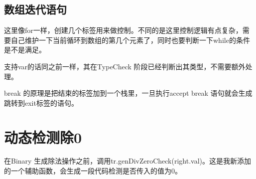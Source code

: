 \documentclass{article}
\theoremstyle{plain}
\theoremstyle{definition}
\begin{document}
    \subsection{数组迭代语句}

    这里像for一样，创建几个标签用来做控制。不同的是这里控制逻辑有点复杂，需要自己维护一下当前循环到数组的第几个元素了，同时也要判断一下while的条件是不是满足。

    支持var的话同之前一样，其在TypeCheck 阶段已经判断出其类型，不需要额外处理。

    break 的原理是把结束的标签加到一个栈里，一旦执行accept break 语句就会生成跳转到exit标签的语句。

    \section{动态检测除0}

    在Binary 生成除法操作之前，调用tr.genDivZeroCheck(right.val)。这是我新添加的一个辅助函数，会生成一段代码检测是否传入的值为0。

    
\end{document}

